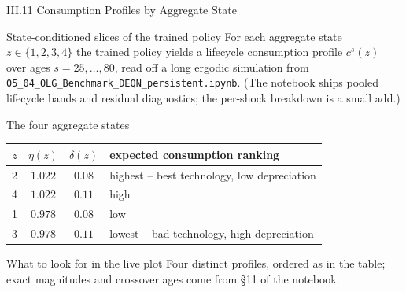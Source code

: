 \documentclass[aspectratio=169,11pt]{beamer}
\newcommand{\emphc}[1]{\textcolor{harvardcrimson}{#1}}
\begin{document}
\begin{frame}{III.11 Consumption Profiles by Aggregate State}
\footnotesize
\begin{block}{State-conditioned slices of the trained policy}
\vspace{-3pt}
For each aggregate state $z \in \{1,2,3,4\}$ the trained policy yields a lifecycle consumption profile $c^s(z)$ over ages $s=25,\ldots,80$, read off a long ergodic simulation from \texttt{05\_04\_OLG\_Benchmark\_DEQN\_persistent.ipynb}.  (The notebook ships pooled lifecycle bands and residual diagnostics; the per-shock breakdown is a small add.)
\end{block}

\begin{block}{The four aggregate states}
\vspace{-3pt}
\centering\renewcommand{\arraystretch}{0.95}
\begin{tabular}{cccl}
\toprule
$z$ & $\eta(z)$ & $\delta(z)$ & expected consumption ranking \\
\midrule
2 & $1.022$ & $0.08$ & \emphc{highest} -- best technology, low depreciation \\
4 & $1.022$ & $0.11$ & high \\
1 & $0.978$ & $0.08$ & low \\
3 & $0.978$ & $0.11$ & \emphc{lowest} -- bad technology, high depreciation \\
\bottomrule
\end{tabular}
\end{block}

\begin{alertblock}{What to look for in the live plot}
\vspace{-3pt}
Four distinct profiles, ordered as in the table; exact magnitudes and crossover ages come from \S 11 of the notebook.
\end{alertblock}
\end{frame}
\end{document}
